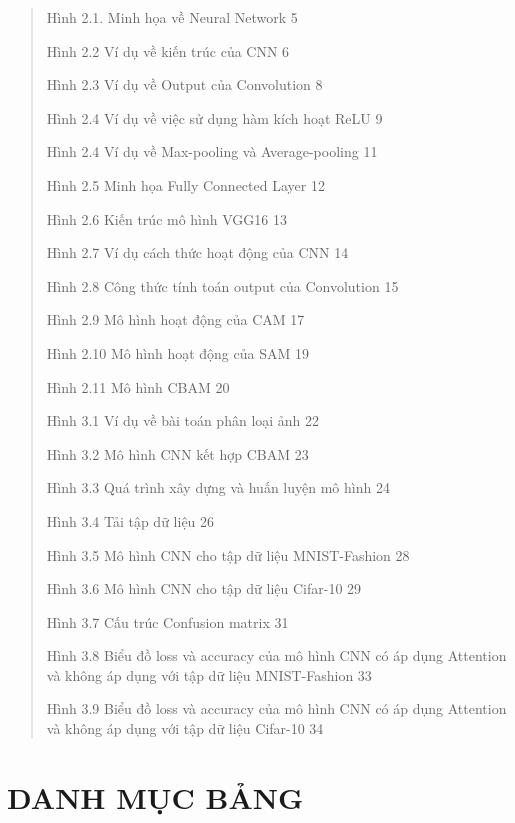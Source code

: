 \documentclass[
]{article}
\begin{document}
\begin{quote}
Hình 2.1. Minh họa về Neural Network 5

Hình 2.2 Ví dụ về kiến trúc của CNN 6

Hình 2.3 Ví dụ về Output của Convolution 8

Hình 2.4 Ví dụ về việc sử dụng hàm kích hoạt ReLU 9

Hình 2.4 Ví dụ về Max-pooling và Average-pooling 11

Hình 2.5 Minh họa Fully Connected Layer 12

Hình 2.6 Kiến trúc mô hình VGG16 13

Hình 2.7 Ví dụ cách thức hoạt động của CNN 14

Hình 2.8 Công thức tính toán output của Convolution 15

Hình 2.9 Mô hình hoạt động của CAM 17

Hình 2.10 Mô hình hoạt động của SAM 19

Hình 2.11 Mô hình CBAM 20

Hình 3.1 Ví dụ về bài toán phân loại ảnh 22

Hình 3.2 Mô hình CNN kết hợp CBAM 23

Hình 3.3 Quá trình xây dựng và huấn luyện mô hình 24

Hình 3.4 Tải tập dữ liệu 26

Hình 3.5 Mô hình CNN cho tập dữ liệu MNIST-Fashion 28

Hình 3.6 Mô hình CNN cho tập dữ liệu Cifar-10 29

Hình 3.7 Cấu trúc Confusion matrix 31

Hình 3.8 Biểu đồ loss và accuracy của mô hình CNN có áp dụng Attention
và không áp dụng với tập dữ liệu MNIST-Fashion 33

Hình 3.9 Biểu đồ loss và accuracy của mô hình CNN có áp dụng Attention
và không áp dụng với tập dữ liệu Cifar-10 34
\end{quote}

\hypertarget{danh-mux1ee5c-bux1ea3ng}{%
\section{DANH MỤC BẢNG}\label{danh-mux1ee5c-bux1ea3ng}}
\end{document}
